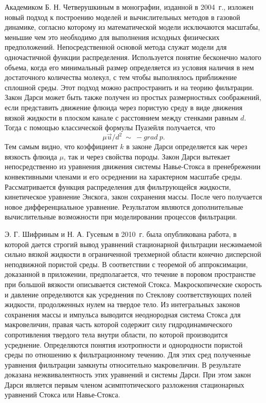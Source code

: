 Академиком Б. Н. Четверушкиным в монографии, изданной в 2004~г., изложен новый подход к построению моделей и вычислительных методов в газовой динамике, согласно которому из математической модели исключаются масштабы, меньшие чем это необходимо для выполнения 
исходных физических предположений. Непосредственной основой метода служат модели для одночастичной функции распределения. Используется понятие бесконечно малого объема, когда его минимальный размер определяется
из условия наличия в нем достаточного количества молекул, с тем чтобы выполнялось приближение сплошной среды. Этот подход можно распространить и на теорию фильтрации. Закон Дарси может быть также получен из простых 
размерностных соображений, если представить движение флюида через пористую среду в виде движения вязкой жидкости в плоском канале с расстоянием между стенками равным $d$. Тогда с помощью классической формулы Пуазейля получается, 
что
\begin{equation}
\label{Darcy}
  {\mu}\overrightarrow{u}/d^2\ \sim \ -grad \ p.
\end{equation}
Тем самым видно, что коэффициент $k$ в законе Дарси определяется как через вязкость флюида $\mu$, так и через свойства породы. Закон Дарси вытекает непосредственно из уравнения движения системы Навье-Стокса в пренебрежении
конвективными членами и его осреднении на характерном масштабе среды. Рассматривается функция распределения для фильтрующейся жидкости, кинетическое уравнение Энскога, закон сохранения массы. После чего получается новое
дифференциальное уравнение. Результатом являются дополнительные вычислительные возможности при моделировании процессов фильтрации.

Э. Г. Шифриным и Н. А. Гусевым в 2010~г. была опубликована работа, в которой дается строгий вывод уравнений стационарной фильтрации несжимаемой сильно вязкой жидкости в ограниченной трехмерной области
конечно дисперсной неподвижной пористой среды. В соответствии с теоремой об аппроксимации, доказанной в приложении, предполагается, что течение в поровом пространстве при большой вязкости описывается системой Стокса.
Макроскопические скорость и давление определяются как усреднения по Стеклову соответствующих полей жидкости, продолженных нулем на твердое тело. Из интегральных законов сохранения массы и импульса выводится неоднородная
система Стокса для макровеличин, правая часть которой содержит силу гидродинамического сопротивления твердого тела внутри области, по которой производится усреднение. Определяются понятия изотропности и однородности пористой
среды по отношению к фильтрационному течению. Для этих сред полученные уравнения фильтрации замкнуты относительно макровеличин. В результате доказана неэквивалентность этих уравнений и системы Дарси. При этом закон Дарси
является первым членом асимптотического разложения стационарных уравнений Стокса или Навье-Стокса.

